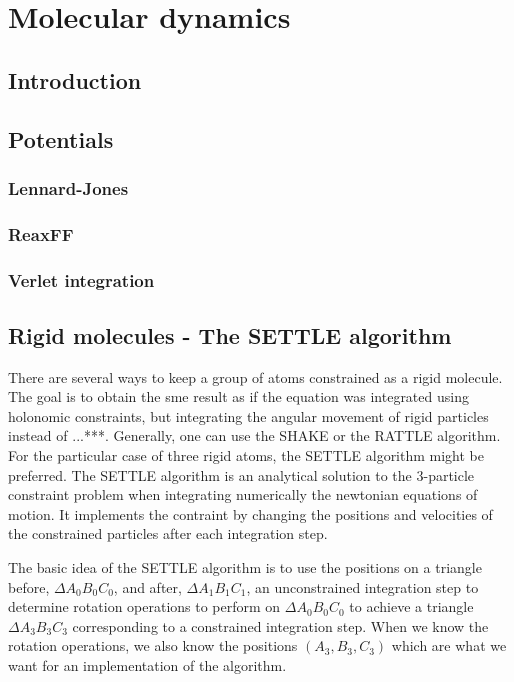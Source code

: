 \chapter{Molecular dynamics}

\section{Introduction}

\section{Potentials}

\subsection{Lennard-Jones}

\subsection{ReaxFF}

\subsection{Verlet integration}

\section{Rigid molecules - The SETTLE algorithm}
There are several ways to keep a group of atoms constrained as a rigid molecule. The goal is to obtain the sme result as if the equation was integrated using holonomic constraints, but integrating the angular movement of rigid particles instead of ...***. Generally, one can use the SHAKE or the RATTLE algorithm. For the particular case of three rigid atoms, the SETTLE algorithm might be preferred. The SETTLE algorithm \cite{Miyamoto1992} is an analytical solution to the 3-particle constraint problem when integrating numerically the newtonian equations of motion. It implements the contraint by changing the positions and velocities of the constrained particles after each integration step.

The basic idea of the SETTLE algorithm is to use the positions on a triangle before, $\Delta A_0 B_0 C_0$, and after, $\Delta A_1 B_1 C_1$, an unconstrained integration step to determine rotation operations to perform on $\Delta A_0 B_0 C_0$ to achieve a triangle $\Delta A_3 B_3 C_3$ corresponding to a constrained integration step. When we know the rotation operations, we also know the positions $(A_3, B_3, C_3)$ which are what we want for an implementation of the algorithm.

